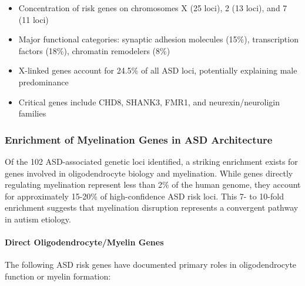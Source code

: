\documentclass[11pt]{article}
\let\oldsubsubsection\subsubsection
\renewcommand{\subsubsection}[1]{\oldsubsubsection{#1}\setlength{\leftskip}{1.5em}}
\begin{document}
\begin{itemize}
\item Concentration of risk genes on chromosomes X (25 loci), 2 (13 loci), and 7 (11 loci)
\item Major functional categories: synaptic adhesion molecules (15\%), transcription factors (18\%), chromatin remodelers (8\%)
\item X-linked genes account for 24.5\% of all ASD loci, potentially explaining male predominance
\item Critical genes include CHD8, SHANK3, FMR1, and neurexin/neuroligin families
\end{itemize}

\subsubsection{Enrichment of Myelination Genes in ASD Architecture}

Of the 102 ASD-associated genetic loci identified, a striking enrichment exists for genes involved in oligodendrocyte biology and myelination. While genes directly regulating myelination represent less than 2\% of the human genome, they account for approximately 15-20\% of high-confidence ASD risk loci. This 7- to 10-fold enrichment suggests that myelination disruption represents a convergent pathway in autism etiology.

\paragraph{Direct Oligodendrocyte/Myelin Genes}
The following ASD risk genes have documented primary roles in oligodendrocyte function or myelin formation:
\end{document}
